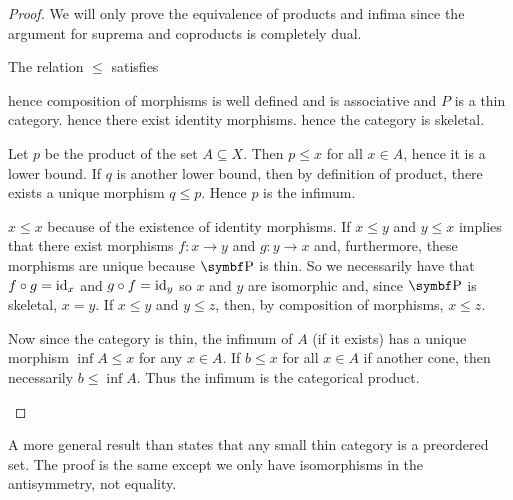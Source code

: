 \begin{proof}
  We will only prove the equivalence of products and infima since the argument for suprema and coproducts is completely dual.

  \begin{description}
    \Implies The relation \( \leq \) satisfies
    \begin{description}
       hence composition of morphisms is well defined and is associative and \( P \) is a thin category.
       hence there exist identity morphisms.
       hence the category is skeletal.
    \end{description}

    Let \( p \) be the product of the set \( A \subseteq X \). Then \( p \leq x \) for all \( x \in A \), hence it is a lower bound. If \( q \) is another lower bound, then by definition of product, there exists a unique morphism \( q \leq p \). Hence \( p \) is the infimum.

    \ImpliedBy\mbox{}
    \begin{description}
       \( x \leq x \) because of the existence of identity morphisms.
       If \( x \leq y \) and \( y \leq x \) implies that there exist morphisms \( f: x \to y \) and \( g: y \to x \) and, furthermore, these morphisms are unique because \( \Cat{P} \) is thin. So we necessarily have that \( f \circ g = \operatorname{id}_x \) and \( g \circ f = \operatorname{id}_y \) so \( x \) and \( y \) are isomorphic and, since \( \Bold{P} \) is skeletal, \( x = y \).
       If \( x \leq y \) and \( y \leq z \), then, by composition of morphisms, \( x \leq z \).
    \end{description}

    Now since the category is thin, the infimum of \( A \) (if it exists) has a unique morphism \( \inf A \leq x \) for any \( x \in A \). If \( b \leq x \) for all \( x \in A \) if another cone, then necessarily \( b \leq \inf A \). Thus the infimum is the categorical product.
  \end{description}
\end{proof}

\begin{remark}\label{remark:small_thin_category_isomorphic_to_preorder}
  A more general result than  states that any small thin category is a preordered set. The proof is the same except we only have isomorphisms in the antisymmetry, not equality.
\end{remark}

